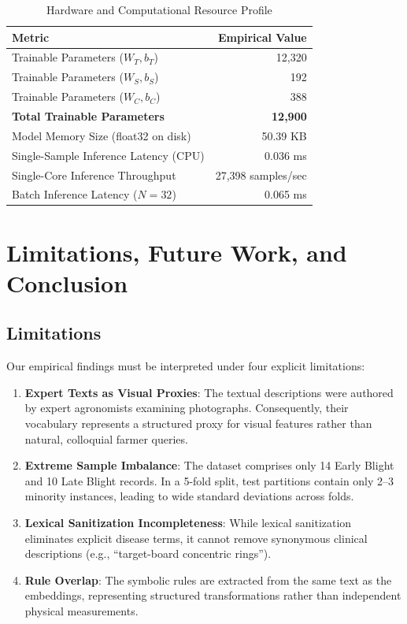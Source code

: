 \documentclass[conference]{IEEEtran}
\begin{document}
\begin{table}[t]
\caption{Hardware and Computational Resource Profile}
\label{tab:resources}
\centering
\begin{tabular}{lr}
\toprule
\textbf{Metric} & \textbf{Empirical Value} \\
\midrule
Trainable Parameters ($W_T, b_T$) & 12,320 \\
Trainable Parameters ($W_S, b_S$) & 192 \\
Trainable Parameters ($W_C, b_C$) & 388 \\
\textbf{Total Trainable Parameters} & \textbf{12,900} \\
\midrule
Model Memory Size (float32 on disk) & 50.39 KB \\
Single-Sample Inference Latency (CPU) & 0.036 ms \\
Single-Core Inference Throughput & 27,398 samples/sec \\
Batch Inference Latency ($N=32$) & 0.065 ms \\
\bottomrule
\end{tabular}
\end{table}

\section{Limitations, Future Work, and Conclusion}

\subsection{Limitations}
Our empirical findings must be interpreted under four explicit limitations:
\begin{enumerate}
    \item \textbf{Expert Texts as Visual Proxies}: The textual descriptions were authored by expert agronomists examining photographs. Consequently, their vocabulary represents a structured proxy for visual features rather than natural, colloquial farmer queries.
    \item \textbf{Extreme Sample Imbalance}: The dataset comprises only 14 Early Blight and 10 Late Blight records. In a 5-fold split, test partitions contain only 2--3 minority instances, leading to wide standard deviations across folds.
    \item \textbf{Lexical Sanitization Incompleteness}: While lexical sanitization eliminates explicit disease terms, it cannot remove synonymous clinical descriptions (e.g., ``target-board concentric rings'').
    \item \textbf{Rule Overlap}: The symbolic rules are extracted from the same text as the embeddings, representing structured transformations rather than independent physical measurements.
\end{enumerate}
\end{document}
